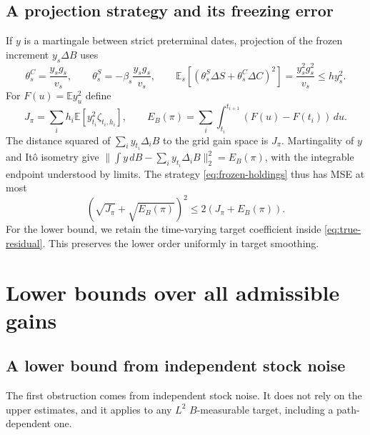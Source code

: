 \documentclass[11pt,a4paper]{amsart}
\theoremstyle{plain}
\theoremstyle{definition}
\theoremstyle{remark}
\newcommand{\EE}{\mathbb{E}}
\newcommand{\Es}{\EE_s}
\begin{document}
\subsection{A projection strategy and its freezing error}
If $y$ is a martingale between strict preterminal dates, projection of the frozen increment $y_s\Delta B$ uses
\begin{equation}\label{eq:frozen-holdings}
 \theta_s^C=\frac{y_sg_s}{v_s},\qquad
 \theta_s^S=-\beta_s\frac{y_sg_s}{v_s},\qquad
 \Es[(\theta_s^S\Delta S+\theta_s^C\Delta C)^2]
       =\frac{y_s^2g_s^2}{v_s}\le h y_s^2.
\end{equation}
For $F(u)=\EE y_u^2$ define
\begin{equation}\label{eq:bridge-quantities}
 J_\pi=\sum_i h_i\EE[y_{t_i}^2\zeta_{t_i,h_i}],\qquad
 E_B(\pi)=\sum_i\int_{t_i}^{t_{i+1}}(F(u)-F(t_i))\,du.
\end{equation}
The distance squared of $\sum_i y_{t_i}\Delta_iB$ to the grid gain space is $J_\pi$. Martingality of $y$ and It\^o isometry give
$\|\int y\,dB-\sum_i y_{t_i}\Delta_iB\|_2^2=E_B(\pi)$, with the integrable endpoint understood by limits. The strategy \eqref{eq:frozen-holdings} thus has MSE at most
\begin{equation}\label{eq:upper-bridge}
 (\sqrt{J_\pi}+\sqrt{E_B(\pi)})^2
 \le2(J_\pi+E_B(\pi)).
\end{equation}
For the lower bound, we retain the time-varying target coefficient inside \eqref{eq:true-residual}. This preserves the lower order uniformly in target smoothing.

\section{Lower bounds over all admissible gains}\label{sec:necessity}

\subsection{A lower bound from independent stock noise}
The first obstruction comes from independent stock noise. It does not rely on the upper estimates, and it applies to any $L^2$ $B$-measurable target, including a path-dependent one.
\end{document}
